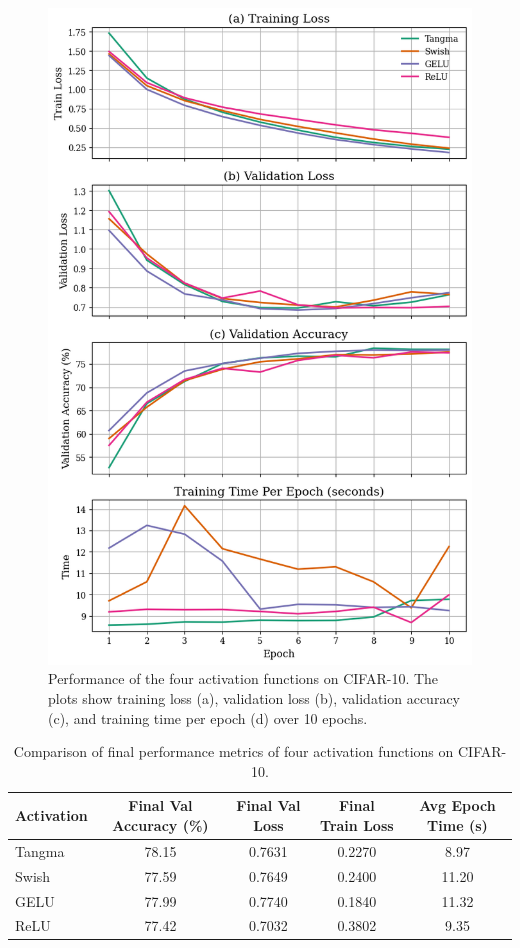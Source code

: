 \documentclass{article}
\begin{document}
\begin{figure}[H]
    \centering
    \includegraphics[width=0.6\linewidth]{cifar_data.png}
    \caption{Performance of the four activation functions on CIFAR-10. The plots show training loss (a), validation loss (b), validation accuracy (c), and training time per epoch (d) over 10 epochs.}
    \label{fig:cifar-performance}
\end{figure}









\begin{table}[h]
\centering
\begin{tabular}{lcccc}
\toprule
Activation & Final Val Accuracy (\%) & Final Val Loss & Final Train Loss & Avg Epoch Time (s) \\
\midrule
Tangma & 78.15 & 0.7631 & 0.2270 & 8.97 \\
Swish  & 77.59 & 0.7649 & 0.2400 & 11.20 \\
GELU   & 77.99 & 0.7740 & 0.1840 & 11.32 \\
ReLU   & 77.42 & 0.7032 & 0.3802 & 9.35 \\
\bottomrule
\end{tabular}
\caption{Comparison of final performance metrics of four activation functions on CIFAR-10.}
\label{tab:cifar_results}
\end{table}
\end{document}
